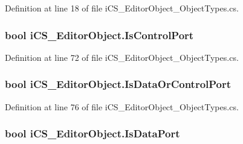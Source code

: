 Definition at line 18 of file i\+C\+S\+\_\+\+Editor\+Object\+\_\+\+Object\+Types.\+cs.

\hypertarget{classi_c_s___editor_object_a2d4bf42734e84a367c71f8e59aabdbb5}{
\subsubsection[{Is\+Control\+Port}]{\setlength{\rightskip}{0pt plus 5cm}bool i\+C\+S\+\_\+\+Editor\+Object.\+Is\+Control\+Port\hspace{0.3cm}{\ttfamily [get]}}}\label{classi_c_s___editor_object_a2d4bf42734e84a367c71f8e59aabdbb5}


Definition at line 72 of file i\+C\+S\+\_\+\+Editor\+Object\+\_\+\+Object\+Types.\+cs.

\hypertarget{classi_c_s___editor_object_a3f7fa3206d2227509aa98a9543ddb6fa}{
\subsubsection[{Is\+Data\+Or\+Control\+Port}]{\setlength{\rightskip}{0pt plus 5cm}bool i\+C\+S\+\_\+\+Editor\+Object.\+Is\+Data\+Or\+Control\+Port\hspace{0.3cm}{\ttfamily [get]}}}\label{classi_c_s___editor_object_a3f7fa3206d2227509aa98a9543ddb6fa}


Definition at line 76 of file i\+C\+S\+\_\+\+Editor\+Object\+\_\+\+Object\+Types.\+cs.

\hypertarget{classi_c_s___editor_object_a44498f6af0069c9ce102133de993aba0}{
\subsubsection[{Is\+Data\+Port}]{\setlength{\rightskip}{0pt plus 5cm}bool i\+C\+S\+\_\+\+Editor\+Object.\+Is\+Data\+Port\hspace{0.3cm}{\ttfamily [get]}}}\label{classi_c_s___editor_object_a44498f6af0069c9ce102133de993aba0}


